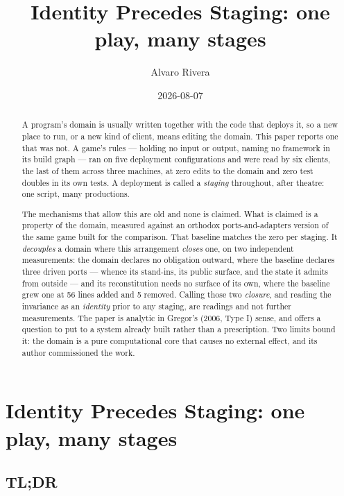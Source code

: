 \documentclass[
]{article}
\title{Identity Precedes Staging: one play, many stages}
\author{Alvaro Rivera}
\date{2026-08-07}
\newcounter{none} %
\begin{document}
\maketitle
\begin{abstract}
A program's domain is usually written together with the code that
deploys it, so a new place to run, or a new kind of client, means
editing the domain. This paper reports one that was not. A game's rules
--- holding no input or output, naming no framework in its build graph
--- ran on five deployment configurations and were read by six clients,
the last of them across three machines, at zero edits to the domain and
zero test doubles in its own tests. A deployment is called a
\emph{staging} throughout, after theatre: one script, many productions.

The mechanisms that allow this are old and none is claimed. What is
claimed is a property of the domain, measured against an orthodox
ports-and-adapters version of the same game built for the comparison.
That baseline matches the zero per staging. It \emph{decouples} a domain
where this arrangement \emph{closes} one, on two independent
measurements: the domain declares no obligation outward, where the
baseline declares three driven ports --- whence its stand-ins, its
public surface, and the state it admits from outside --- and its
reconstitution needs no surface of its own, where the baseline grew one
at 56 lines added and 5 removed. Calling those two \emph{closure}, and
reading the invariance as an \emph{identity} prior to any staging, are
readings and not further measurements. The paper is analytic in Gregor's
(2006, Type I) sense, and offers a question to put to a system already
built rather than a prescription. Two limits bound it: the domain is a
pure computational core that causes no external effect, and its author
commissioned the work.
\end{abstract}

\section{Identity Precedes Staging: one play, many
stages}\label{identity-precedes-staging-one-play-many-stages}

\subsection{TL;DR}\label{tldr}
\end{document}
